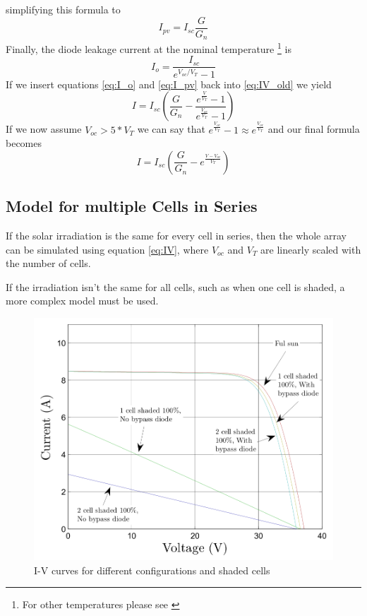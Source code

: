 simplifying this formula to
\begin{equation} \label{eq:I_pv}
    I_{pv} = I_{sc} \frac{G}{G_n}
\end{equation}
Finally, the  diode  leakage  current  at  the nominal temperature \footnote{For
other temperatures please see \cite{ref:villa:pvmodel}} is
\begin{equation} \label{eq:I_o}
    I_o = \frac{I_{sc}}{e^{V_{oc} / V_T} - 1}
\end{equation}
If  we   insert   equations   \eqref{eq:I_o}   and   \eqref{eq:I_pv}  back  into
\eqref{eq:IV_old} we yield
\begin{equation}
    I = I_{sc} \left( \frac{G}{G_n} - \frac{e^{\frac{V}{V_T}}-1}{e^{\frac{V_{oc}}{V_T}}-1} \right)
\end{equation}
If we now assume $V_{oc} > 5 * V_T$ we can  say  that  $e^{\frac{V_{oc}}{V_T}}-1
\approx e^{\frac{V_{oc}}{V_T}}$ and our final formula becomes
\begin{equation} \label{eq:IV}
    I = I_{sc} \left( \frac{G}{G_n} - e^{\frac{V - V_{oc}}{V_T}} \right)
\end{equation}


\subsection{Model for multiple Cells in Series}

If the solar irradiation is the same  for  every  cell in series, then the whole
array  can be simulated using equation \eqref{eq:IV}, where $V_{oc}$  and  $V_T$
are linearly scaled with the number of cells.

If the irradiation isn't the same for all  cells,  such  as  when  one  cell  is
shaded, a more complex model must be used.
\begin{figure}[h]
	\center
    \includegraphics[width=.5\textwidth]{images/model/shaded.png}
    \caption{I-V curves for different configurations and shaded cells\cite{ref:tian:model}}
    \label{fig:model:shaded}
\end{figure}

